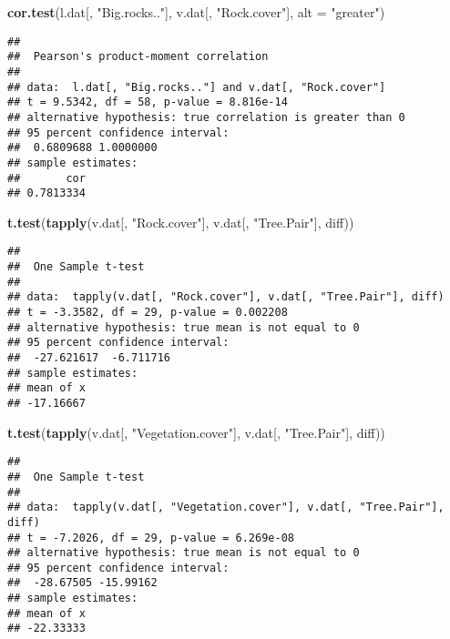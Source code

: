 \documentclass[]{article}
\newenvironment{Shaded}{\begin{snugshade}}{\end{snugshade}}
\newcommand{\KeywordTok}[1]{\textcolor[rgb]{0.13,0.29,0.53}{\textbf{#1}}}
\newcommand{\DataTypeTok}[1]{\textcolor[rgb]{0.13,0.29,0.53}{#1}}
\newcommand{\StringTok}[1]{\textcolor[rgb]{0.31,0.60,0.02}{#1}}
\newcommand{\NormalTok}[1]{#1}
\begin{document}
\begin{Shaded}
\begin{Highlighting}[]
\KeywordTok{cor.test}\NormalTok{(l.dat[, }\StringTok{"Big.rocks.."}\NormalTok{], v.dat[, }\StringTok{"Rock.cover"}\NormalTok{], }\DataTypeTok{alt =} \StringTok{"greater"}\NormalTok{)}
\end{Highlighting}
\end{Shaded}

\begin{verbatim}
## 
##  Pearson's product-moment correlation
## 
## data:  l.dat[, "Big.rocks.."] and v.dat[, "Rock.cover"]
## t = 9.5342, df = 58, p-value = 8.816e-14
## alternative hypothesis: true correlation is greater than 0
## 95 percent confidence interval:
##  0.6809688 1.0000000
## sample estimates:
##       cor 
## 0.7813334
\end{verbatim}

\begin{Shaded}
\begin{Highlighting}[]
\KeywordTok{t.test}\NormalTok{(}\KeywordTok{tapply}\NormalTok{(v.dat[, }\StringTok{"Rock.cover"}\NormalTok{], v.dat[, }\StringTok{"Tree.Pair"}\NormalTok{], diff))}
\end{Highlighting}
\end{Shaded}

\begin{verbatim}
## 
##  One Sample t-test
## 
## data:  tapply(v.dat[, "Rock.cover"], v.dat[, "Tree.Pair"], diff)
## t = -3.3582, df = 29, p-value = 0.002208
## alternative hypothesis: true mean is not equal to 0
## 95 percent confidence interval:
##  -27.621617  -6.711716
## sample estimates:
## mean of x 
## -17.16667
\end{verbatim}

\begin{Shaded}
\begin{Highlighting}[]
\KeywordTok{t.test}\NormalTok{(}\KeywordTok{tapply}\NormalTok{(v.dat[, }\StringTok{"Vegetation.cover"}\NormalTok{], v.dat[, }\StringTok{"Tree.Pair"}\NormalTok{], diff))}
\end{Highlighting}
\end{Shaded}

\begin{verbatim}
## 
##  One Sample t-test
## 
## data:  tapply(v.dat[, "Vegetation.cover"], v.dat[, "Tree.Pair"], diff)
## t = -7.2026, df = 29, p-value = 6.269e-08
## alternative hypothesis: true mean is not equal to 0
## 95 percent confidence interval:
##  -28.67505 -15.99162
## sample estimates:
## mean of x 
## -22.33333
\end{verbatim}
\end{document}
